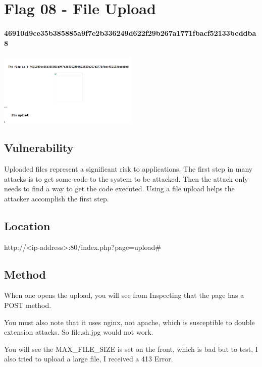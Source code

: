 \section{Flag 08 - File Upload}

\paragraph{46910d9ce35b385885a9f7e2b336249d622f29b267a1771fbacf52133beddba8}

\begin{center}
    \includegraphics[width=0.5\textwidth]{11.Flag08/08-03.png}\\[0cm] 
\end{center}

\subsection{Vulnerability}

Uploaded files represent a significant risk to applications. The first step in many attacks is to get some code to the system to be attacked. Then the attack only needs to find a way to get the code executed. Using a file upload helps the attacker accomplish the first step.

\subsection{Location}

http://<ip-address>:80/index.php?page=upload\#

\subsection{Method}

When one opens the upload, you will see from Inspecting that the page has a POST method.

You must also note that it uses nginx, not apache, which is susceptible to double extension attacks. So file.sh.jpg would not work.

You will see the MAX\_FILE\_SIZE is set on the front, which is bad but to test, I also tried to upload a large file, I received a 413 Error.

